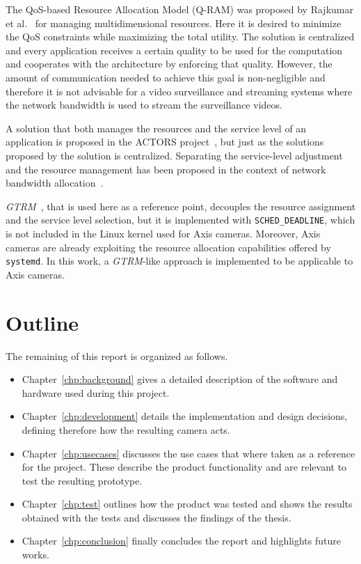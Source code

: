 \documentclass[nobiblatex]{LTHthesis}
\begin{document}
The QoS-based Resource Allocation Model (Q-RAM) was proposed by Rajkumar et 
al.~\cite{Raj97a} for managing multidimensional resources. Here it is 
desired to minimize the QoS constraints while maximizing the total 
utility. The solution is centralized and every application receives a
certain quality to be used for the computation and cooperates with the
architecture by enforcing that quality. However, the amount of communication
needed to achieve this goal is non-negligible and therefore it is not
advisable for a video surveillance and streaming systems where the network
bandwidth is used to stream the surveillance videos.
 
A solution that both manages the resources and the service level of an 
application is proposed in the ACTORS project~\cite{Bin11}, but just as the 
solutions proposed by \cite{Raj97a,Soj11,Arz11} the solution is centralized. 
Separating the service-level adjustment and the resource management has been proposed in the context of network bandwidth allocation~\cite{Sil11}.

\emph{GTRM}~\cite{gtrm}, that is used here as a reference point, decouples the
resource assignment and the service level selection, but it is implemented
with \texttt{SCHED\_DEADLINE}, which is not included in the Linux kernel
used for Axis cameras. Moreover, Axis cameras are already exploiting the
resource allocation capabilities offered by \texttt{systemd}. In this
work, a \emph{GTRM}-like approach is implemented to be applicable to Axis cameras.

\section{Outline}

The remaining of this report is organized as follows.

\begin{itemize}
\item Chapter~\ref{chp:background} gives a detailed description of
  the software and hardware used during this project.



\item Chapter~\ref{chp:development} details the implementation and design
  decisions, defining therefore how the resulting camera acts.
\item Chapter~\ref{chp:usecases} discusses the use cases that where
  taken as a reference for the project. These describe the product
  functionality and are relevant to test the resulting prototype.
\item Chapter~\ref{chp:test} outlines how the product was tested and shows the results obtained with the tests and discusses the findings of the thesis.
\item Chapter~\ref{chp:conclusion} finally concludes the report and
  highlights future works.
\end{itemize}
\end{document}
